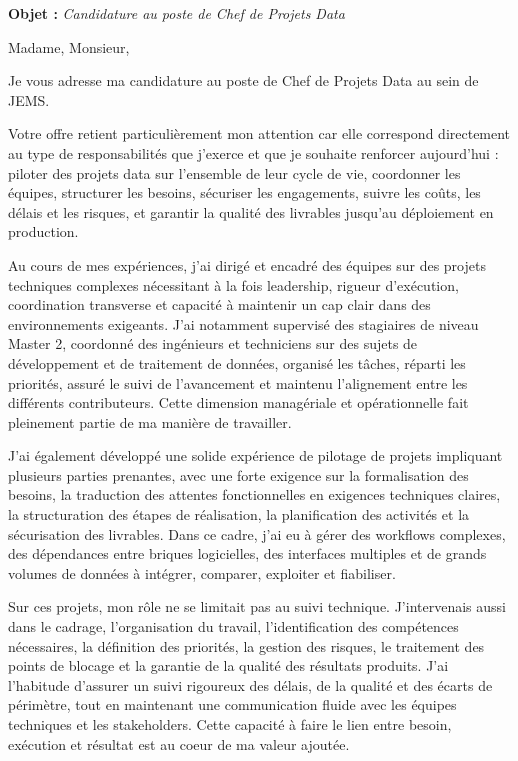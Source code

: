 \documentclass[11pt,a4paper]{altacv}
\begin{document}
\makecvheader
\vspace{-0.6cm}
\vspace{-0.4cm}

{\color{accent}\textbf{Objet :}} \textit{Candidature au poste de Chef de Projets Data}

{\color{body}

Madame, Monsieur,

Je vous adresse ma candidature au poste de Chef de Projets Data au sein de JEMS.

Votre offre retient particulièrement mon attention car elle correspond directement au type de responsabilités que j'exerce et que je souhaite renforcer aujourd'hui : piloter des projets data sur l'ensemble de leur cycle de vie, coordonner les équipes, structurer les besoins, sécuriser les engagements, suivre les coûts, les délais et les risques, et garantir la qualité des livrables jusqu'au déploiement en production.

Au cours de mes expériences, j'ai dirigé et encadré des équipes sur des projets techniques complexes nécessitant à la fois leadership, rigueur d'exécution, coordination transverse et capacité à maintenir un cap clair dans des environnements exigeants. J'ai notamment supervisé des stagiaires de niveau Master 2, coordonné des ingénieurs et techniciens sur des sujets de développement et de traitement de données, organisé les tâches, réparti les priorités, assuré le suivi de l'avancement et maintenu l'alignement entre les différents contributeurs. Cette dimension managériale et opérationnelle fait pleinement partie de ma manière de travailler.

J'ai également développé une solide expérience de pilotage de projets impliquant plusieurs parties prenantes, avec une forte exigence sur la formalisation des besoins, la traduction des attentes fonctionnelles en exigences techniques claires, la structuration des étapes de réalisation, la planification des activités et la sécurisation des livrables. Dans ce cadre, j'ai eu à gérer des workflows complexes, des dépendances entre briques logicielles, des interfaces multiples et de grands volumes de données à intégrer, comparer, exploiter et fiabiliser.

Sur ces projets, mon rôle ne se limitait pas au suivi technique. J'intervenais aussi dans le cadrage, l'organisation du travail, l'identification des compétences nécessaires, la définition des priorités, la gestion des risques, le traitement des points de blocage et la garantie de la qualité des résultats produits. J'ai l'habitude d'assurer un suivi rigoureux des délais, de la qualité et des écarts de périmètre, tout en maintenant une communication fluide avec les équipes techniques et les stakeholders. Cette capacité à faire le lien entre besoin, exécution et résultat est au coeur de ma valeur ajoutée.

}
\end{document}

